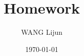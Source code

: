 \documentclass[12pt]{article}
\title{Homework}
\author{WANG Lijun}
\date{\today}
\begin{document}
\maketitle
\pagestyle{fancy}
\lhead{}
\rhead{}

\textcite{mithani2009stochastic}

\parencite{padilla2018adaptive}

\printbibliography
\end{document}
